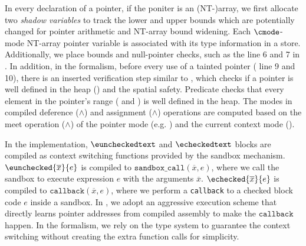 %
In every declaration  of a pointer,
if the poniter is an (NT-)array,
we first allocate two \emph{shadow variables}
to track the lower and upper bounds which are potentially changed for pointer arithmetic and NT-array bound widening.
Each $\cmode$-mode NT-array pointer variable is associated with its type information in a store.
Additionally, we place bounds and null-pointer checks, such as the line 6 and 7 in .
In addition, in the formalism, before every use of a tainted pointer ( line 9 and 10), 
there is an inserted verification step similar to ,
which checks if a pointer is well defined in the heap () and the spatial safety.
Predicate  checks that every element in the pointer's range ( and ) is well defined in the heap.  
The modes in compiled deference ($\wedge$)
 and assignment ($\wedge$) operations 
are computed based on the meet 
operation ($\wedge$) of the pointer mode (e.g. ) and the current context mode ().

%
In the \systemname implementation,
$\euncheckedtext$ and $\echeckedtext$ blocks 
are compiled as context switching functions provided by the sandbox mechanism.
$\eunchecked{\overline{x}}{e}$ is compiled to 
$\texttt{sandbox\_call}(\overline{x},e)$, where we call the sandbox 
to execute expression $e$ with the arguments $\overline{x}$.
$\echecked{\overline{x}}{e}$ is compiled to 
$\texttt{callback}(\overline{x},e)$, where we perform 
a \texttt{callback} to a checked block code $e$ inside a sandbox.
In \systemname, we adopt an aggressive execution scheme that
directly learns pointer addresses from compiled assembly to make the $\texttt{callback}$ happen.
In the formalism, we rely on the type system to 
guarantee the context switching without creating the extra function calls for simplicity.



